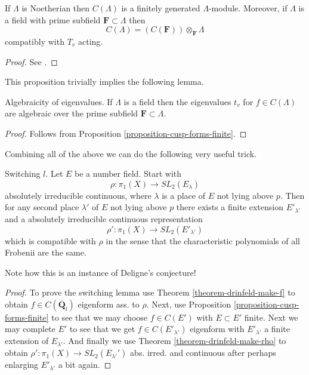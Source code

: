 \begin{proposition}
\label{proposition-cusp-forms-finite}
If $\Lambda$ is Noetherian then $C(\Lambda)$ is a
finitely generated $\Lambda$-module. Moreover, if $\Lambda$ is a field with
prime subfield $\mathbf{F} \subset \Lambda$ then
$$
C(\Lambda)=(C(\mathbf{F}))\otimes_{\mathbf{F}}\Lambda
$$
compatibly with $T_v$ acting.
\end{proposition}

\begin{proof}
See \cite[Proposition 4.7]{dJ-conjecture}.
\end{proof}

\noindent
This proposition trivially implies the following lemma.

\begin{lemma}
\label{lemma-eigenvalues-algebraic}
Algebraicity of eigenvalues.
If $\Lambda$ is a field then the eigenvalues $t_v$ for $f\in
C(\Lambda)$ are algebraic over the prime subfield
$\mathbf{F} \subset \Lambda$.
\end{lemma}

\begin{proof}
Follows from Proposition \ref{proposition-cusp-forms-finite}.
\end{proof}

\noindent
Combining all of the above we can do the following very useful trick.

\begin{lemma}
\label{lemma-switch-l}
Switching $l$. Let $E$ be a number field.
Start with
$$
\rho: \pi_1(X)\to SL_2(E_\lambda)
$$
absolutely irreducible continuous, where $\lambda$ is a place of $E$
not lying above $p$. Then for any second place $\lambda'$ of $E$
not lying above $p$ there exists a finite extension $E'_{\lambda'}$
and a absolutely irreducible continuous representation
$$
\rho': \pi_1(X)\to SL_2(E'_{\lambda'})
$$
which is compatible with $\rho$ in the sense that the characteristic
polynomials of all Frobenii are the same.
\end{lemma}

\noindent
Note how this is an instance of Deligne's conjecture!

\begin{proof}
To prove the switching lemma use
Theorem \ref{theorem-drinfeld-make-f}
to obtain $f\in C(\overline{\mathbf{Q}}_l)$ eigenform ass. to $\rho$.
Next, use
Proposition \ref{proposition-cusp-forms-finite}
to see that we may choose $f\in C(E')$ with $E \subset E'$ finite.
Next we may complete $E'$ to see that we get
$f\in C(E'_{\lambda'})$ eigenform with
$E'_{\lambda'}$ a finite extension of $E_{\lambda'}$.
And finally we use
Theorem \ref{theorem-drinfeld-make-rho}
to obtain
$\rho': \pi_1(X) \to SL_2(E_{\lambda'}')$ abs. irred. and continuous
after perhaps enlarging $E'_{\lambda'}$ a bit again.
\end{proof}

